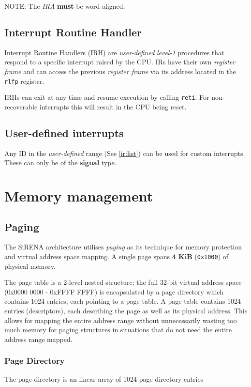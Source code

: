 \documentclass[a4paper,10pt]{article}
\begin{document}
NOTE: The \emph{IRA} \textbf{must} be word-aligned.

\subsection{Interrupt Routine Handler} \label{ir:HANDLER}
Interrupt Routine Handlers (IRH) are \emph{user-defined} \emph{level-1} procedures that respond to a specific interrupt raised by the CPU. IRs have their own \emph{register frame} and can access the previous \emph{register frame} via its address located in the \verb|rlfp| register.

IRHs can exit at any time and resume execution by calling \verb|reti|. For non-recoverable interrupts this will result in the CPU being reset.

\subsection{User-defined interrupts}
Any ID in the \emph{user-defined} range (See \ref{ir:list}) can be used for custom interrupts. These can only be of the \textbf{signal} type.

\section{Memory management}
\subsection{Paging}
The SiRENA architecture utilises \emph{paging} as its technique for memory protection and virtual address space mapping. A single page spans \textbf{4 KiB} (\verb|0x1000|) of physical memory.

The page table is a 2-level nested structure; the full 32-bit virtual address space (0x0000 0000 - 0xFFFF FFFF) is encapsulated by a page directory which contains 1024 entries, each pointing to a page table. A page table contains 1024 entries (descriptors), each describing the page as well as its physical address. This allows for mapping the entire address range without unnecessarily wasting too much memory for paging structures in situations that do not need the entire address range mapped.

\subsubsection{Page Directory}
The page directory is an linear array of 1024 page directory entries
\end{document}
